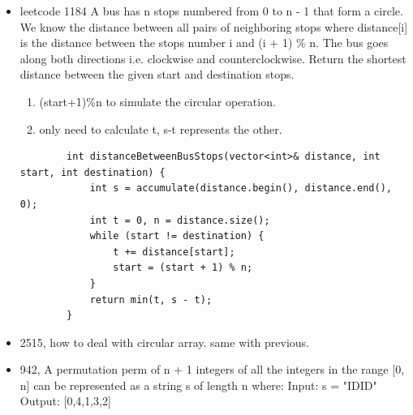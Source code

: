 \documentclass[a4paper,11pt,twoside]{book}
\begin{document}
\begin{itemize}
\begin{enumerate}
		Return true if there exists a pattern of length m that is repeated k or more times, otherwise return false.
		
		\item 2760 You are given a 0-indexed integer array nums and an integer threshold.
		
		Find the length of the longest subarray of nums starting at index l and ending at index r (0 <= l <= r < nums.length) that satisfies the following conditions:
		
		nums[l] \% 2 == 0
		For all indices i in the range [l, r - 1], nums[i] \% 2 != nums[i + 1] \% 2
		For all indices i in the range [l, r], nums[i] <= threshold
		Return an integer denoting the length of the longest such subarray.
		
		\item 
	\end{enumerate}
	
	
	\item leetcode 1184 A bus has n stops numbered from 0 to n - 1 that form a circle. We know the distance between all pairs of neighboring stops where distance[i] is the distance between the stops number i and (i + 1) \% n. The bus goes along both directions i.e. clockwise and counterclockwise. Return the shortest distance between the given start and destination stops.
	
	\begin{enumerate}
		\item (start+1)\%n to simulate the circular operation.
		
		\item only need to calculate t,  s-t represents the other.
	\end{enumerate}
	
	\begin{lstlisting}
		int distanceBetweenBusStops(vector<int>& distance, int start, int destination) {
			int s = accumulate(distance.begin(), distance.end(), 0);
			int t = 0, n = distance.size();
			while (start != destination) {
				t += distance[start];
				start = (start + 1) % n;
			}
			return min(t, s - t);
		}	
	\end{lstlisting}
		
	\item 2515, how to deal with circular array. same with previous.
	
	\item 942,  A permutation perm of n + 1 integers of all the integers in the range [0, n] can be represented as a string s of length n where: Input: s = "IDID" Output: [0,4,1,3,2] 
	

\end{itemize}
\end{document}

